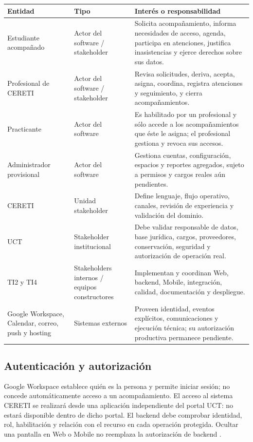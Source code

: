 \documentclass[10pt,a4paper,oneside]{article}
\begin{document}
\small
\begin{tabularx}{\textwidth}{@{}L{0.20\textwidth}L{0.28\textwidth}Y@{}}
\toprule
\textbf{Entidad} & \textbf{Tipo} & \textbf{Interés o responsabilidad}\\
\midrule
Estudiante acompañado & Actor del software / stakeholder & Solicita acompañamiento, informa necesidades de acceso, agenda, participa en atenciones, justifica inasistencias y ejerce derechos sobre sus datos.\\
Profesional de CERETI & Actor del software / stakeholder & Revisa solicitudes, deriva, acepta, asigna, coordina, registra atenciones y seguimiento, y cierra acompañamientos.\\
Practicante & Actor del software & Es habilitado por un profesional y sólo accede a los acompañamientos que éste le asigna; el profesional gestiona y revoca sus accesos.\\
Administrador provisional & Actor del software & Gestiona cuentas, configuración, espacios y reportes agregados, sujeto a permisos y cargos reales aún pendientes.\\
CERETI & Unidad stakeholder & Define lenguaje, flujo operativo, canales, revisión de experiencia y validación del dominio.\\
UCT & Stakeholder institucional & Debe validar responsable de datos, base jurídica, cargos, proveedores, conservación, seguridad y autorización de operación real.\\
TI2 y TI4 & Stakeholders internos / equipos constructores & Implementan y coordinan Web, backend, Mobile, integración, calidad, documentación y despliegue.\\
Google Workspace, Calendar, correo, push y hosting & Sistemas externos & Proveen identidad, eventos explícitos, comunicaciones y ejecución técnica; su autorización productiva permanece pendiente.\\
\bottomrule
\end{tabularx}
\normalsize

\subsection{Autenticación y autorización}

Google Workspace establece quién es la persona y permite iniciar sesión; no concede automáticamente acceso a un acompañamiento. El acceso al sistema CERETI se realizará desde una aplicación independiente del portal UCT: no estará disponible dentro de dicho portal. El backend debe comprobar identidad, rol, habilitación y relación con el recurso en cada operación protegida. Ocultar una pantalla en Web o Mobile no reemplaza la autorización de backend \citep{adr002,especificacion,tech}.
\end{document}
